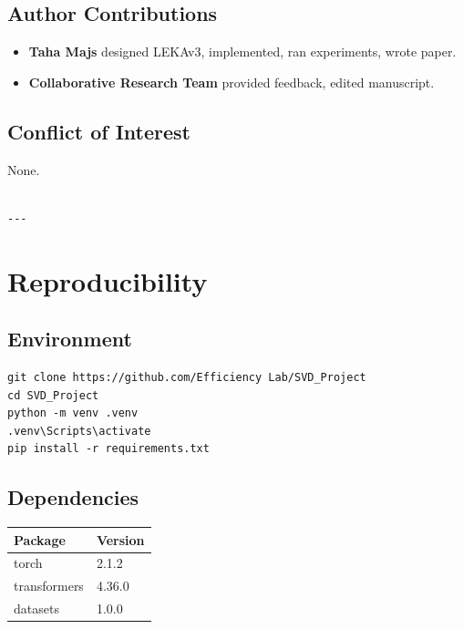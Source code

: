 \subsection{Author Contributions}

\begin{itemize}
\item \textbf{Taha Majs} designed LEKAv3, implemented, ran experiments, wrote paper.
\item \textbf{Collaborative Research Team} provided feedback, edited manuscript.

\end{itemize}
\subsection{Conflict of Interest}

None.
\begin{lstlisting}

---
\end{lstlisting}

\section{Reproducibility}

\subsection{Environment}

\begin{lstlisting}
git clone https://github.com/Efficiency Lab/SVD_Project
cd SVD_Project
python -m venv .venv
.venv\Scripts\activate
pip install -r requirements.txt
\end{lstlisting}

\subsection{Dependencies}

\begin{table}[H]
\centering
\small
\begin{tabular}{ll}
\toprule
\textbf{Package} & \textbf{Version} \\
\midrule
torch & 2.1.2 \\
transformers & 4.36.0 \\
datasets & 1.0.0 \\
\bottomrule
\end{tabular}
\end{table}

